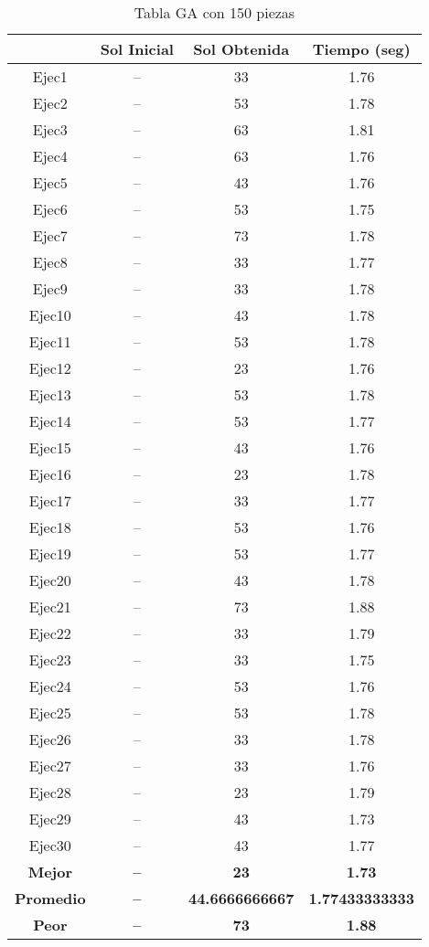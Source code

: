 \begin{center}
\begin{table}
\end{table}

\begin{table}

\begin{tabular}{|c|c|c|c|}
\hline
 & {\bf Sol Inicial} & {\bf Sol Obtenida} & {\bf Tiempo (seg)} \\
\hline
Ejec1 & -- & 33  & 1.76 \\
\hline
Ejec2 & -- & 53  & 1.78 \\
\hline
Ejec3 & -- & 63  & 1.81 \\
\hline
Ejec4 & -- & 63  & 1.76 \\
\hline
Ejec5 & -- & 43  & 1.76 \\
\hline
Ejec6 & -- & 53  & 1.75 \\
\hline
Ejec7 & -- & 73  & 1.78 \\
\hline
Ejec8 & -- & 33  & 1.77 \\
\hline
Ejec9 & -- & 33  & 1.78 \\
\hline
Ejec10 & -- & 43  & 1.78 \\
\hline
Ejec11 & -- & 53  & 1.78 \\
\hline
Ejec12 & -- & 23  & 1.76 \\
\hline
Ejec13 & -- & 53  & 1.78 \\
\hline
Ejec14 & -- & 53  & 1.77 \\
\hline
Ejec15 & -- & 43  & 1.76 \\
\hline
Ejec16 & -- & 23  & 1.78 \\
\hline
Ejec17 & -- & 33  & 1.77 \\
\hline
Ejec18 & -- & 53  & 1.76 \\
\hline
Ejec19 & -- & 53  & 1.77 \\
\hline
Ejec20 & -- & 43  & 1.78 \\
\hline
Ejec21 & -- & 73  & 1.88 \\
\hline
Ejec22 & -- & 33  & 1.79 \\
\hline
Ejec23 & -- & 33  & 1.75 \\
\hline
Ejec24 & -- & 53  & 1.76 \\
\hline
Ejec25 & -- & 53  & 1.78 \\
\hline
Ejec26 & -- & 33  & 1.78 \\
\hline
Ejec27 & -- & 33  & 1.76 \\
\hline
Ejec28 & -- & 23  & 1.79 \\
\hline
Ejec29 & -- & 43  & 1.73 \\
\hline
Ejec30 & -- & 43  & 1.77 \\
\hline
{\bf Mejor} & {\bf -- } & {\bf 23} & {\bf 1.73} \\
\hline
{\bf Promedio} & {\bf -- } & {\bf 44.6666666667} & {\bf 1.77433333333} \\
\hline
{\bf Peor} & {\bf -- } & {\bf 73} & {\bf 1.88} \\
\hline
\end{tabular}
\caption{Tabla GA con 150 piezas}

\end{table}

\end{center}

